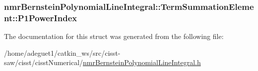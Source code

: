 \hypertarget{structnmr_bernstein_polynomial_line_integral_1_1_term_summation_element_a3eca58974e87a3625ec449a076fed408}{
\subsubsection[{P1\-Power\-Index}]{ nmr\-Bernstein\-Polynomial\-Line\-Integral\-::\-Term\-Summation\-Element\-::\-P1\-Power\-Index}}\label{structnmr_bernstein_polynomial_line_integral_1_1_term_summation_element_a3eca58974e87a3625ec449a076fed408}


The documentation for this struct was generated from the following file\-:\begin{DoxyCompactItemize}
\item 
/home/adeguet1/catkin\-\_\-ws/src/cisst-\/saw/cisst/cisst\-Numerical/\hyperlink{nmr_bernstein_polynomial_line_integral_8h}{nmr\-Bernstein\-Polynomial\-Line\-Integral.\-h}\end{DoxyCompactItemize}
